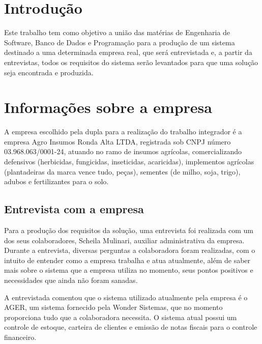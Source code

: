 \documentclass[serif, english, brazilian, oneside]{uffstex}
\begin{document}
\pretextual%

\imprimircapa%

\listoffigures*
\cleardoublepage%

\tableofcontents*
\cleardoublepage%

\textual%

\chapter{Introdução}

Este trabalho tem como objetivo a união das matérias de Engenharia de Software, Banco de Dados e Programação para a produção de um sistema destinado a uma determinada empresa real, que será entrevistada e, a partir da entrevistas, todos os requisitos do sistema serão levantados para que uma solução seja encontrada e produzida.

\chapter{Informações sobre a empresa}

A empresa escolhido pela dupla para a realização do trabalho integrador é a empresa Agro Insumos Ronda Alta LTDA, registrada sob CNPJ número 03.968.063/0001-24, atuando no ramo de insumos agrícolas, comercializando defensivos (herbicidas, fungicidas, inseticidas, acaricidas), implementos agrícolas (plantadeiras da marca vence tudo, peças), sementes (de milho, soja, trigo), adubos e fertilizantes para o solo.

\section{Entrevista com a empresa}

Para a produção dos requisitos da solução, uma entrevista foi realizada com um dos seus colaboradores, Scheila Mulinari, auxiliar administrativa da empresa. Durante a entrevista, diversas perguntas a colaboradora foram realizadas, com o intuito de entender como a empresa trabalha e atua atualmente, além de saber mais sobre o sistema que a empresa utiliza no momento, seus pontos positivos e necessidades que ainda não foram sanadas.

A entrevistada comentou que o sistema utilizado atualmente pela empresa é o AGER, um sistema fornecido pela Wonder Sistemas, que no momento proporciona tudo que a colaboradora necessita. O sistema atual possui um controle de estoque, carteira de clientes e emissão de notas fiscais para o controle financeiro.
\end{document}
